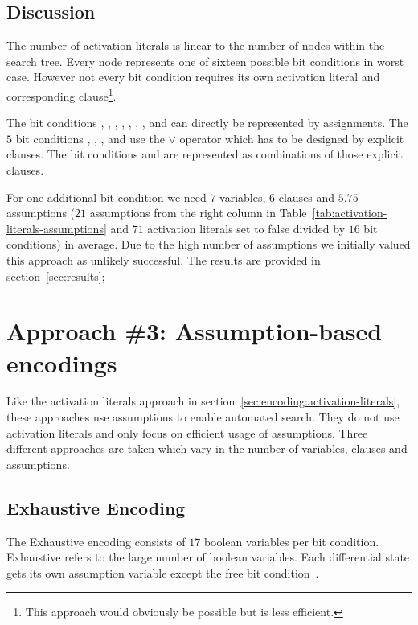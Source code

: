 \subsection{Discussion}
\label{sec:activation-literals-discussion}
%
The number of activation literals is linear to the number of nodes within the search tree. Every node represents one of sixteen possible bit conditions in worst case. However not every bit condition requires its own activation literal and corresponding clause\footnote{This approach would obviously be possible but is less efficient.}.

The bit conditions , , , , , , ,  and  can directly be represented by assignments. The $5$ bit conditions \bc{\#}, , ,  and  use the $\lor$ operator which has to be designed by explicit clauses. The bit conditions  and \bc{-} are represented as combinations of those explicit clauses.

For one additional bit condition we need $7$ variables, $6$ clauses and $5.75$ assumptions ($21$ assumptions from the right column in Table~\ref{tab:activation-literals-assumptions} and $71$ activation literals set to false divided by $16$ bit conditions) in average. Due to the high number of assumptions we initially valued this approach as unlikely successful. The results are provided in section~\ref{sec:results};

\newpage
\section{Approach \#3: Assumption-based encodings}
\label{sec:encoding:assumption-encodings}
%
Like the activation literals approach in section~\ref{sec:encoding:activation-literals}, these approaches use assumptions to enable automated search. They do not use activation literals and only focus on efficient usage of assumptions. Three different approaches are taken which vary in the number of variables, clauses and assumptions.

\subsection{Exhaustive Encoding}
\label{sec:encoding:exhaustive}
%
The Exhaustive encoding consists of $17$ boolean variables per bit condition. Exhaustive refers to the large number of boolean variables. Each differential state gets its own assumption variable except the free bit condition~.

